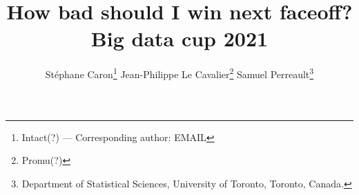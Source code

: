 \usepackage{bbm}

\usepackage{fancyhdr}

\pagestyle{fancy}
\fancyhf{}
\renewcommand{\headrulewidth}{0pt} %
\rfoot{\thepage}

\usepackage[margin=1in]{geometry}


\title{How bad should I win next faceoff?\\ {\normalsize Big data cup 2021}}


\author{
Stéphane Caron\footnote{Intact(?) --- Corresponding author: EMAIL} \qquad
Jean-Philippe Le Cavalier\footnote{Promu(?)}  \qquad
Samuel Perreault\footnote{Department of Statistical Sciences, University of Toronto, Toronto, Canada.}
}

